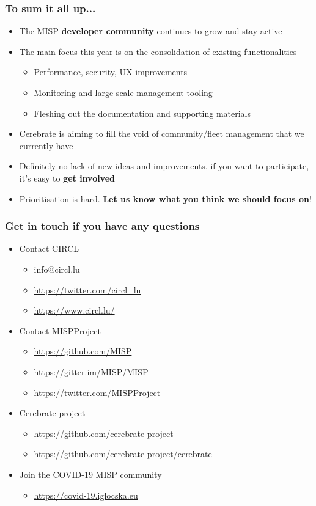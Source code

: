 \begin{frame}
  \frametitle{To sum it all up...}
  \begin{itemize}
     \item The MISP {\bf developer community} continues to grow and stay active
     \item The main focus this year is on the consolidation of existing functionalities
     \begin{itemize}
          \item Performance, security, UX improvements
          \item Monitoring and large scale management tooling
          \item Fleshing out the documentation and supporting materials
     \end{itemize}
     \item Cerebrate is aiming to fill the void of community/fleet management that we currently have
     \item Definitely no lack of new ideas and improvements, if you want to participate, it's easy to {\bf get involved}
     \item Prioritisation is hard. {\bf Let us know what you think we should focus on}!
  \end{itemize}
\end{frame}

\begin{frame}
  \frametitle{Get in touch if you have any questions}
  \begin{itemize}
    \item Contact CIRCL
    \begin{itemize}
      \item info@circl.lu
      \item \url{https://twitter.com/circl_lu}
      \item \url{https://www.circl.lu/}
    \end{itemize}
    \item Contact MISPProject 
    \begin{itemize}
      \item \url{https://github.com/MISP}
      \item \url{https://gitter.im/MISP/MISP}
      \item \url{https://twitter.com/MISPProject}
    \end{itemize}
    \item Cerebrate project
    \begin{itemize}
      \item \url{https://github.com/cerebrate-project}
      \item \url{https://github.com/cerebrate-project/cerebrate}
    \end{itemize}
    \item Join the COVID-19 MISP community
    \begin{itemize}
      \item \url{https://covid-19.iglocska.eu}
    \end{itemize}
  \end{itemize}
\end{frame}

